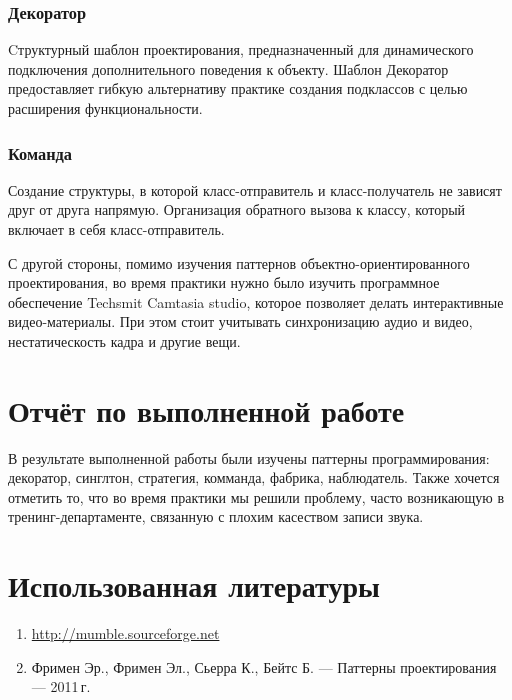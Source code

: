 \documentclass[a4paper,12pt,notitlepage,pdftex,headsepline]{scrreprt}
\begin{document}
\subsection{Декоратор}
Cтруктурный шаблон проектирования, предназначенный для динамического
подключения дополнительного поведения к объекту.
Шаблон Декоратор предоставляет гибкую альтернативу практике создания
подклассов с целью расширения функциональности.
\subsection{Команда}
Создание структуры, в которой класс-отправитель и класс-получатель не зависят
друг от друга напрямую.
Организация обратного вызова к классу, который включает в себя
класс-отправитель.

С другой стороны, помимо изучения паттернов объектно-ориентированного
проектирования, во время практики нужно было изучить программное обеспечение
Techsmit Camtasia studio, которое позволяет делать интерактивные
видео-материалы.
При этом стоит учитывать синхронизацию аудио и видео, нестатическость кадра и
другие вещи.

\chapter{Отчёт по выполненной работе}

В результате выполненной работы были изучены паттерны программирования:
декоратор, синглтон, стратегия, комманда, фабрика, наблюдатель.
Также хочется отметить то, что во время практики мы решили проблему, часто
возникающую в тренинг-департаменте, связанную с плохим касеством записи звука.

\chapter{Использованная литературы}
\begin{enumerate}
  \item \url{http://mumble.sourceforge.net}
  \item Фримен Эр., Фримен Эл., Сьерра К., Бейтс Б. --- Паттерны
    проектирования --- 2011\,г.
\end{enumerate}
\end{document}
